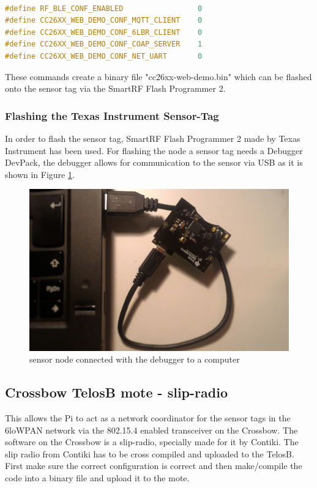 \begin{lstlisting}[basicstyle=\small,language=c,caption={The configurisation file for the web-demo in directory: contiki/examples/cc26xx/cc26xx-web-demo/project-confg.h}]

#define RF_BLE_CONF_ENABLED                 0
#define CC26XX_WEB_DEMO_CONF_MQTT_CLIENT    0
#define CC26XX_WEB_DEMO_CONF_6LBR_CLIENT    0
#define CC26XX_WEB_DEMO_CONF_COAP_SERVER    1
#define CC26XX_WEB_DEMO_CONF_NET_UART       0
\end{lstlisting}

These commands create a binary file "cc26xx-web-demo.bin" which can be flashed onto the sensor tag via the SmartRF Flash Programmer 2.


\subsubsection{Flashing the Texas Instrument Sensor-Tag} 
\label{sec:flash}
In order to flash the sensor tag, SmartRF Flash Programmer 2 made by Texas Instrument has been used. For flashing the node a sensor tag needs a Debugger DevPack, the debugger allows for communication to the sensor via USB as it is shown in Figure \ref{fig:debug}.  
\begin{figure}[!h]
	\begin{center} 	
		\includegraphics[width=0.8\linewidth]{debugger}
		\caption{sensor node connected with the debugger to a computer}
		\label{fig:debug}
	\end{center}
\end{figure} 

\subsection{Crossbow TelosB mote - slip-radio}
This allows the Pi to act as a network coordinator for the sensor tags in the 6loWPAN network via the 802.15.4 enabled transceiver on the Crossbow. The software on the Crossbow is a slip-radio, specially made for it by Contiki. The slip radio from Contiki has to be cross compiled and uploaded to the TelosB. First make sure the correct configuration is correct and then make/compile the code into a binary file and upload it to the mote.

